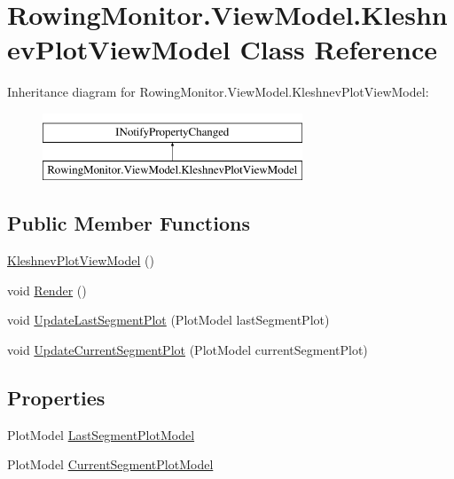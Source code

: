 \hypertarget{class_rowing_monitor_1_1_view_model_1_1_kleshnev_plot_view_model}{}\section{Rowing\+Monitor.\+View\+Model.\+Kleshnev\+Plot\+View\+Model Class Reference}
\label{class_rowing_monitor_1_1_view_model_1_1_kleshnev_plot_view_model}
Inheritance diagram for Rowing\+Monitor.\+View\+Model.\+Kleshnev\+Plot\+View\+Model\+:\begin{figure}[H]
\begin{center}
\leavevmode
\includegraphics[height=2.000000cm]{class_rowing_monitor_1_1_view_model_1_1_kleshnev_plot_view_model}
\end{center}
\end{figure}
\subsection*{Public Member Functions}
\begin{DoxyCompactItemize}
\item 
\hyperlink{class_rowing_monitor_1_1_view_model_1_1_kleshnev_plot_view_model_a4389cc85cf8f9505fc14e8c9dac8ce36}{Kleshnev\+Plot\+View\+Model} ()
\item 
void \hyperlink{class_rowing_monitor_1_1_view_model_1_1_kleshnev_plot_view_model_ae9d5c76eadb7b4830a05757b0f1cedc3}{Render} ()
\item 
void \hyperlink{class_rowing_monitor_1_1_view_model_1_1_kleshnev_plot_view_model_abf17c79d9aa509a6e21b44ccfa47bc8c}{Update\+Last\+Segment\+Plot} (Plot\+Model last\+Segment\+Plot)
\item 
void \hyperlink{class_rowing_monitor_1_1_view_model_1_1_kleshnev_plot_view_model_a7d0c67c1ca826d8de7ff9093d19f9d72}{Update\+Current\+Segment\+Plot} (Plot\+Model current\+Segment\+Plot)
\end{DoxyCompactItemize}
\subsection*{Properties}
\begin{DoxyCompactItemize}
\item 
Plot\+Model \hyperlink{class_rowing_monitor_1_1_view_model_1_1_kleshnev_plot_view_model_af35d0a979c83141a6dc40e71df701ed2}{Last\+Segment\+Plot\+Model}
\item 
Plot\+Model \hyperlink{class_rowing_monitor_1_1_view_model_1_1_kleshnev_plot_view_model_a7d8136280ae36f895edb930c7235da7b}{Current\+Segment\+Plot\+Model}
\end{DoxyCompactItemize}
